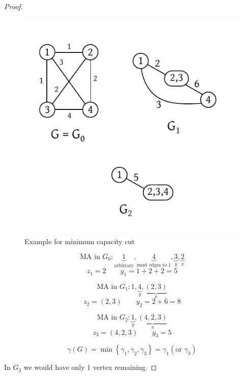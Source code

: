 \documentclass[a4paper]{article}
\theoremstyle{definition}
\newcommand{\set}[1]{\left\{#1\right\}}
\begin{document}
\begin{proof}
  \begin{figure}[ht]
    \begin{center}
      \includegraphics{img/min_capacity_cut.pdf}
      \caption{Example for minimum capacity cut}
    \end{center}
  \end{figure}

  \[
    \text{MA in $G_0$}:
      \underbrace{1}_{\text{arbitrary}},
      \underbrace{4}_{\text{most edges to 1}},
      \underbrace{3}_{y},
      \underbrace{2}_{x}
  \] \[
    z_1 = 2 \qquad y_1 = 1 + 2 + 2 = 5
  \]

  \[
    \text{MA in $G_1$}:
      1,
      \underbrace{4}_{y},
      \underbrace{(2,3)}_{x}
  \] \[
    z_2 = (2, 3) \qquad y_2 = 2 + 6 = 8
  \]

  \[
    \text{MA in $G_2$}:
      \underbrace{1}_y,
      \underbrace{(4,2,3)}_{x}
  \] \[
    z_3 = (4, 2, 3) \qquad y_3 = 5
  \]

  \[
    \gamma(G) = \min\set{\gamma_1, \gamma_2, \gamma_3} = \gamma_1 (\text{or } \gamma_3)
  \]

  In $G_3$ we would have only 1 vertex remaining.
\end{proof}
\end{document}
